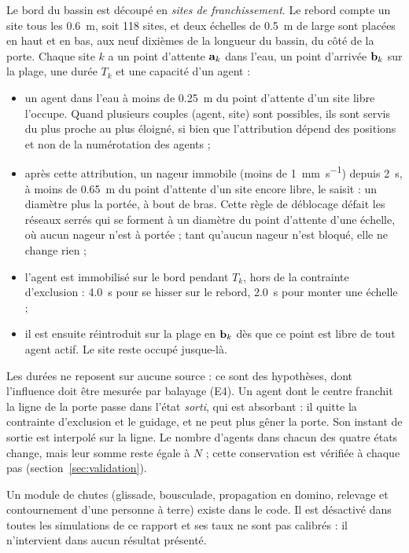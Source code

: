 Le bord du bassin est découpé en \emph{sites de franchissement}. Le rebord
compte un site tous les \SI{0.6}{\metre}, soit 118 sites, et deux échelles de
\SI{0.5}{\metre} de large sont placées en haut et en bas, aux neuf dixièmes de
la longueur du bassin, du côté de la porte. Chaque site $k$ a un point d'attente $\mathbf{a}_k$ dans
l'eau, un point d'arrivée $\mathbf{b}_k$ sur la plage, une durée $T_k$ et une
capacité d'un agent :
\begin{itemize}
\item un agent dans l'eau à moins de \SI{0.25}{\metre} du point d'attente d'un
  site libre l'occupe. Quand plusieurs couples (agent, site) sont possibles, ils
  sont servis du plus proche au plus éloigné, si bien que l'attribution dépend
  des positions et non de la numérotation des agents ;
\item après cette attribution, un nageur immobile (moins de
  \SI{1}{\milli\metre\per\second}) depuis \SI{2}{\second}, à moins de
  \SI{0.65}{\metre} du point d'attente d'un site encore libre, le saisit : un
  diamètre plus la portée, à bout de bras. Cette règle de déblocage défait les
  réseaux serrés qui se forment à un diamètre du point d'attente d'une échelle,
  où aucun nageur n'est à portée ; tant qu'aucun nageur n'est bloqué, elle ne
  change rien ;
\item l'agent est immobilisé sur le bord pendant $T_k$, hors de la contrainte
  d'exclusion : \SI{4.0}{\second} pour se hisser sur le rebord,
  \SI{2.0}{\second} pour monter une échelle ;
\item il est ensuite réintroduit sur la plage en $\mathbf{b}_k$ dès que ce point
  est libre de tout agent actif. Le site reste occupé jusque-là.
\end{itemize}
Les durées ne reposent sur aucune source : ce sont des hypothèses, dont
l'influence doit être mesurée par balayage (E4). Un agent dont le centre franchit la ligne de la porte
passe dans l'état \emph{sorti}, qui est absorbant : il quitte la contrainte
d'exclusion et le guidage, et ne peut plus gêner la porte. Son instant de
sortie est interpolé sur la ligne. Le nombre d'agents dans chacun des quatre
états change, mais leur somme reste égale à $N$ ; cette conservation est
vérifiée à chaque pas (section~\ref{sec:validation}).

Un module de chutes (glissade, bousculade, propagation en domino, relevage et
contournement d'une personne à terre) existe dans le code. Il est désactivé dans toutes les
simulations de ce rapport et ses taux ne sont pas calibrés : il n'intervient
dans aucun résultat présenté.

